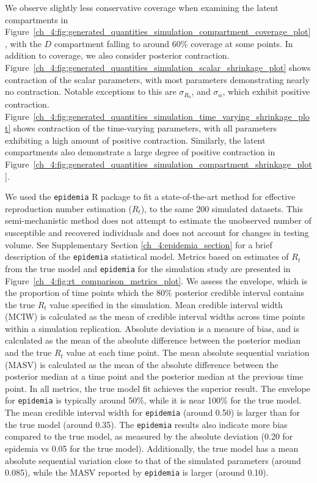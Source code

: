 We observe slightly less conservative coverage when examining the latent compartments in Figure~\ref{ch_4:fig:generated_quantities_simulation_compartment_coverage_plot}, with the \( D \) compartment falling to around 60\% coverage at some points.
In addition to coverage, we also consider posterior contraction.
Figure~\ref{ch_4:fig:generated_quantities_simulation_scalar_shrinkage_plot} shows contraction of the scalar parameters, with most parameters demonstrating nearly no contraction.
Notable exceptions to this are \( \sigma_{R_0} \), and \( \sigma_\alpha \), which exhibit positive contraction.
Figure~\ref{ch_4:fig:generated_quantities_simulation_time_varying_shrinkage_plot} shows contraction of the time-varying parameters, with all parameters exhibiting a high amount of positive contraction.
Similarly, the latent compartments also demonstrate a large degree of positive contraction in Figure~\ref{ch_4:fig:generated_quantities_simulation_compartment_shrinkage_plot}.

We used the \texttt{epidemia} R package \citep{epidemia} to fit a state-of-the-art method for effective reproduction number estimation (\( R_t \)), to the same 200 simulated datasets.
This semi-mechanistic method does not attempt to estimate the unobserved number of susceptible and recovered individuals and does not account for changes in testing volume.
See Supplementary Section \ref{ch_4:epidemia_section} for a brief description of the \texttt{epidemia} statistical model.
Metrics based on estimates of \( R_t \) from the true model and \texttt{epidemia} for the simulation study are presented in Figure~\ref{ch_4:fig:rt_comparison_metrics_plot}.
We assess the envelope, which is the proportion of time points which the 80\% posterior credible interval contains the true \( R_t \) value specified in the simulation.
Mean credible interval width (MCIW) is calculated as the mean of credible interval widths across time points within a simulation replication.
Absolute deviation is a measure of bias, and is calculated as the mean of the absolute difference between the posterior median and the true \( R_t \) value at each time point.
The mean absolute sequential variation (MASV) is calculated as the mean of the absolute difference between the posterior median at a time point and the posterior median at the previous time point.
In all metrics, the true model fit achieves the superior result.
The envelope for \texttt{epidemia} is typically around 50\%, while it is near 100\% for the true model.
The mean credible interval width for \texttt{epidemia} (around 0.50) is larger than for the true model (around 0.35).
The \texttt{epidemia} results also indicate more bias compared to the true model, as measured by the absolute deviation (0.20 for epidemia vs 0.05 for the true model).
Additionally, the true model has a mean absolute sequential variation close to that of the simulated parameters (around 0.085), while the MASV reported by \texttt{epidemia} is larger (around 0.10).
\par
